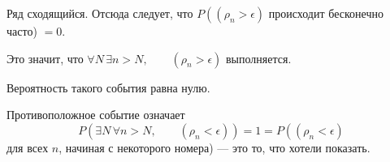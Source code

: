 Ряд сходящийся.
Отсюда следует, что $P \left( \left( \rho_n > \epsilon \right) \right.$ происходит бесконечно часто) $= 0$.

Это значит, что $ \forall N \, \exists n > N, \qquad \left( \rho_n > \epsilon \right) $ выполняется.

Вероятность такого события равна нулю.

Противоположное событие означает
$$P \left( \exists N \, \forall n > N, \qquad \left( \rho_n < \epsilon \right) \right) =
1 =
P \left( \left( \rho_n < \epsilon \right) \right.$$
для всех $n$, начиная с некоторого номера) --- это то, что хотели показать.
